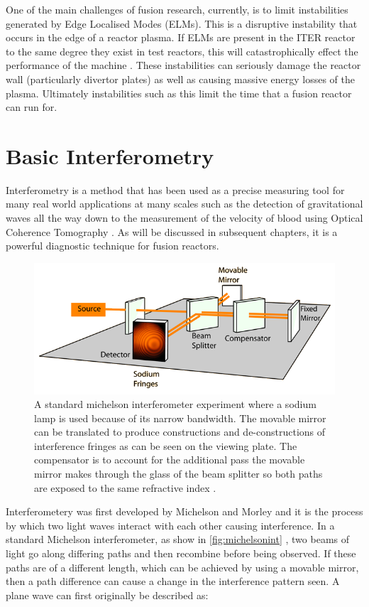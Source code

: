 \documentclass[12pt,a4paper,oneside]{report}
\begin{document}
One of the main challenges of fusion research, currently, is to limit instabilities generated by Edge Localised Modes (ELMs). This is a disruptive instability that occurs in the edge of a reactor plasma. If ELMs are present in the ITER reactor to the same degree they exist in test reactors, this will catastrophically effect the performance of the machine \cite{Loarte2014ProgressOperation}. These instabilities can seriously damage the reactor wall (particularly divertor plates) as well as causing massive energy losses of the plasma. Ultimately instabilities such as this limit the time that a fusion reactor can run for.
	
	\section{Basic Interferometry}
Interferometry is a method that has been used as a precise measuring tool for many real world applications at many scales such as the detection of gravitational waves \cite{AbbottObservationMerger} all the way down to the measurement of the velocity of blood using Optical Coherence Tomography \cite{Zhao2000Phase-resolvedSensitivity}. As will be discussed in subsequent chapters, it is a powerful diagnostic technique for fusion reactors.
\begin{figure}[H]
\includegraphics[width=1\textwidth, center,angle=0]{Images/michelsonint.png}
\caption{A standard michelson interferometer experiment where a sodium lamp is used because of its narrow bandwidth. The movable mirror can be translated to produce constructions and de-constructions of interference fringes as can be seen on the viewing plate. The compensator is to account for the additional pass the movable mirror makes through the glass of the beam splitter so both paths are exposed to the same refractive index \cite{Michelsonimage}.}
\label{fig:michelsonint}
\end{figure}

Interferometery was first developed by Michelson and Morley \cite{Michelson1887RelativeEther} and it is the process by which two light waves interact with each other causing interference. In a standard Michelson interferometer, as show in \autoref{fig:michelsonint} , two beams of light go along differing paths and then recombine before being observed. If these paths are of a different length, which can be achieved by using a movable mirror, then a path difference can cause a change in the interference pattern seen. A plane wave can first originally be described as: 
\end{document}
